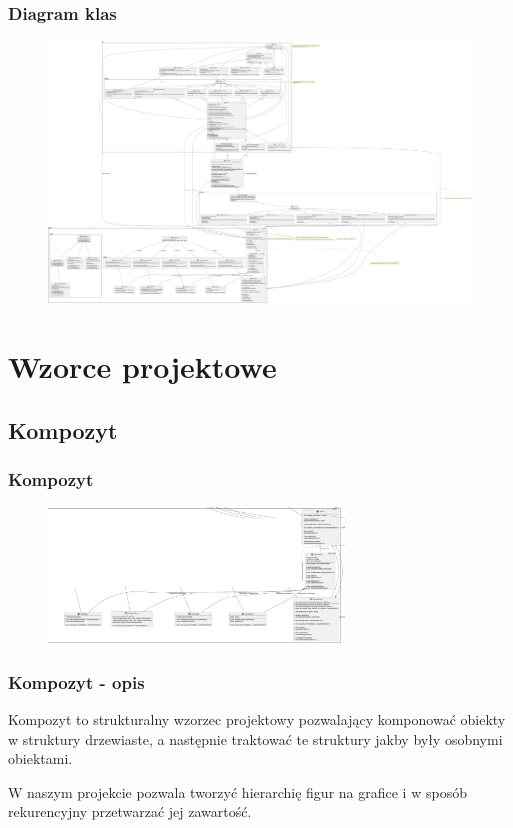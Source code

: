\documentclass[
	11pt,]{beamer}
\begin{document}
\begin{frame}
	\frametitle{Diagram klas}
	
	\begin{figure}
		\includegraphics[height=0.7\textheight]{figures/class_diagram.pdf}
	\end{figure}
\end{frame}


\section{Wzorce projektowe}

\subsection{Kompozyt}

\begin{frame}
	\frametitle{Kompozyt}
	
	\begin{figure}
		\includegraphics[width=0.7\textwidth]{figures/kompozyt.pdf}
	\end{figure}
\end{frame}

\begin{frame}
	\frametitle{Kompozyt - opis}
	Kompozyt to strukturalny wzorzec projektowy pozwalający komponować obiekty w struktury drzewiaste, a następnie traktować te struktury jakby były osobnymi obiektami.
	
	\vfill
	
	W naszym projekcie pozwala tworzyć hierarchię figur na grafice i w sposób rekurencyjny przetwarzać jej zawartość.
	
\end{frame}
\end{document}
